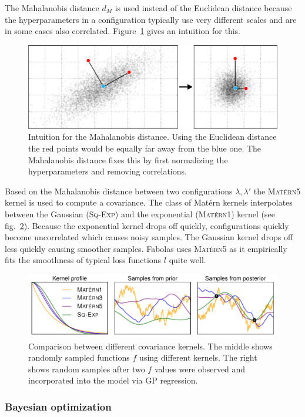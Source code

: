 The Mahalanobis distance \(d_M\) is used instead of the Euclidean distance because the hyperparameters in a configuration typically use very different scales and are in some cases also correlated.
Figure~\ref{fig:fabolas:mahalanobis} gives an intuition for this.
\begin{figure}
	\centering
	\includegraphics[width=0.75\linewidth]{gfx/fabolas/mahalanobisDistance.pdf}
	\caption{
		Intuition for the Mahalanobis distance.
		Using the Euclidean distance the red points would be equally far away from the blue one.
		The Mahalanobis distance fixes this by first normalizing the hyperparameters and removing correlations.
	}\label{fig:fabolas:mahalanobis}
\end{figure}

Based on the Mahalanobis distance between two configurations \(\lambda, \lambda'\) the \textsc{Matérn5} kernel is used to compute a covariance.
The class of Matérn kernels interpolates between the Gaussian (\textsc{Sq-Exp}) and the exponential (\textsc{Matérn1}) kernel (see fig.~\ref{fig:fabolas:matern}).
Because the exponential kernel drops off quickly, configurations quickly become uncorrelated which causes noisy samples.
The Gaussian kernel drops off less quickly causing smoother samples.
Fabolas uses \textsc{Matérn5} as it empirically fits the smoothness of typical loss functions \(l\) quite well.
\begin{figure}
	\centering
	\includegraphics[width=0.75\linewidth]{gfx/fabolas/matern.pdf}
	\caption{
		Comparison between different covariance kernels.
		The middle shows randomly sampled functions \(f\) using different kernels.
		The right shows random samples after two \(f\) values were observed and incorporated into the model via GP regression.
	}\label{fig:fabolas:matern}
\end{figure}

\subsubsection{Bayesian optimization}%
\label{sec:hyperparams:fabolas:bayesian}

